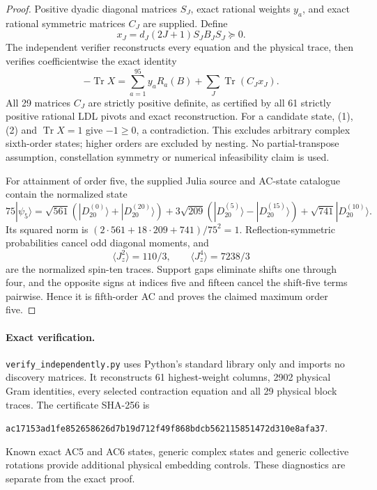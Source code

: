 \documentclass[11pt]{article}
\newcommand{\Tr}{\operatorname{Tr}}
\begin{document}
\begin{proof}
Positive dyadic diagonal matrices $S_J$, exact rational weights $y_a$,
and exact rational symmetric matrices $C_J$ are supplied. Define
\[
 x_J=d_J(2J+1)S_JB_JS_J\succeq0.
\]
The independent verifier reconstructs every equation and the physical
trace, then verifies coefficientwise the exact identity
\[
 \boxed{-\Tr X=\sum_{a=1}^{95}y_aR_a(B)+\sum_J\Tr(C_Jx_J).} \tag{2}
\]
All 29 matrices $C_J$ are strictly positive definite, as certified by all
61 strictly positive rational LDL pivots and exact reconstruction.
For a candidate state, (1), (2) and $\Tr X=1$ give $-1\ge0$, a
contradiction. This excludes arbitrary complex sixth-order states;
higher orders are excluded by nesting. No partial-transpose assumption,
constellation symmetry or numerical infeasibility claim is used.

For attainment of order five, the supplied Julia source and AC-state
catalogue contain the normalized state
\[
 75|\psi_5\rangle=
 \sqrt{561}(|D_{20}^{(0)}\rangle+|D_{20}^{(20)}\rangle)
 +3\sqrt{209}(|D_{20}^{(5)}\rangle-|D_{20}^{(15)}\rangle)
 +\sqrt{741}|D_{20}^{(10)}\rangle.
\]
Its squared norm is $(2\cdot561+18\cdot209+741)/75^2=1$.
Reflection-symmetric probabilities cancel odd diagonal moments, and
\[
 \langle J_z^2\rangle=110/3,\qquad
 \langle J_z^4\rangle=7238/3
\]
are the normalized spin-ten traces. Support gaps eliminate shifts one
through four, and the opposite signs at indices five and fifteen cancel
the shift-five terms pairwise. Hence it is fifth-order AC and proves the
claimed maximum order five.
\end{proof}
\paragraph{Exact verification.}
\texttt{verify\_independently.py} uses Python's standard library only and
imports no discovery matrices. It reconstructs 61 highest-weight columns,
2902 physical Gram identities, every selected contraction equation and
all 29 physical block traces. The certificate SHA-256 is
\begin{center}\small\texttt{ac17153ad1fe852658626d7b19d712f49f868bdcb562115851472d310e8afa37}.\end{center}
Known exact AC5 and AC6 states, generic complex states and generic
collective rotations provide additional physical embedding controls.
These diagnostics are separate from the exact proof.
\end{document}
